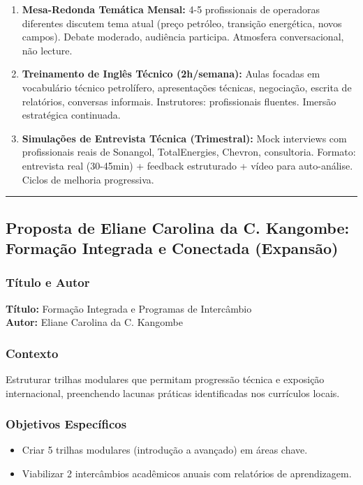 \documentclass[12pt,a4paper]{article}
\begin{document}
\begin{enumerate}[itemsep=0.2cm]
    \item \textbf{Mesa-Redonda Temática Mensal:} 4-5 profissionais de operadoras diferentes discutem tema atual (preço petróleo, transição energética, novos campos). Debate moderado, audiência participa. Atmosfera conversacional, não lecture.
    
    \item \textbf{Treinamento de Inglês Técnico (2h/semana):} Aulas focadas em vocabulário técnico petrolífero, apresentações técnicas, negociação, escrita de relatórios, conversas informais. Instrutores: profissionais fluentes. Imersão estratégica continuada.
    
    \item \textbf{Simulações de Entrevista Técnica (Trimestral):} Mock interviews com profissionais reais de Sonangol, TotalEnergies, Chevron, consultoria. Formato: entrevista real (30-45min) + feedback estruturado + vídeo para auto-análise. Ciclos de melhoria progressiva.
\end{enumerate}

\textcolor{spe-secondary}{\hspace{0.5cm}\rule{0.4\linewidth}{0.8pt}}

\subsection{Proposta de Eliane Carolina da C. Kangombe: Formação Integrada e Conectada (Expansão)}

\subsubsection*{Título e Autor}
\textbf{Título:} Formação Integrada e Programas de Intercâmbio \\
\textbf{Autor:} Eliane Carolina da C. Kangombe

\subsubsection*{Contexto}
Estruturar trilhas modulares que permitam progressão técnica e exposição internacional, preenchendo lacunas práticas identificadas nos currículos locais.

\subsubsection*{Objetivos Específicos}
\begin{itemize}
    \item Criar 5 trilhas modulares (introdução a avançado) em áreas chave.
    \item Viabilizar 2 intercâmbios acadêmicos anuais com relatórios de aprendizagem.
\end{itemize}
\end{document}
